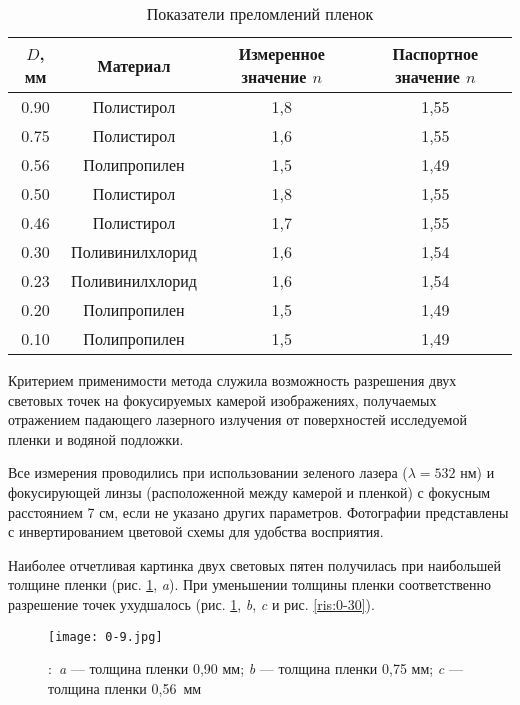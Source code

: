 \begin{table}[h]\small
\caption*{Показатели преломлений пленок}
\begin{center}
\begin{tabular}{|c|c|c|c|}
\hline
$D$, мм & Материал & Измеренное значение $n$ & Паспортное значение $n$ \\ \hline
0.90 & Полистирол & 1,8 & 1,55\\ \hline
0.75 & Полистирол & 1,6 & 1,55\\ \hline
0.56 & Полипропилен & 1,5 & 1,49\\ \hline
0.50 & Полистирол & 1,8 & 1,55\\ \hline
0.46 & Полистирол & 1,7 & 1,55\\ \hline
0.30 & Поливинилхлорид & 1,6 & 1,54\\ \hline
0.23 & Поливинилхлорид & 1,6 & 1,54\\ \hline
0.20 & Полипропилен & 1,5 & 1,49\\ \hline
0.10 & Полипропилен & 1,5 & 1,49\\ \hline
\end{tabular}
\end{center}
\label{tab:tab1-D}
\end{table}


Критерием применимости метода служила возможность разрешения двух световых точек на фокусируемых камерой изображениях, получаемых отражением падающего лазерного излучения от поверхностей исследуемой пленки и водяной подложки.


Все измерения проводились при использовании зеленого лазера
($\lambda=532$ нм) и фокусирующей линзы (расположенной между камерой и пленкой) с фокусным расстоянием 7 см, если не указано других параметров. Фотографии представлены с инвертированием цветовой схемы для удобства восприятия.


Наиболее отчетливая картинка двух световых пятен получилась при наибольшей толщине пленки (рис. \ref{ris:0-9}, \emph{a}). При уменьшении толщины пленки соответственно разрешение точек ухудшалось (рис. \ref{ris:0-9}, \emph{b}, \emph{c} и рис. \ref{ris:0-30}).

\begin{figure}[h]
\begin{center}
\texttt{[image: 0-9.jpg]}
\end{center}
\caption{\!\!\!\!:\ \emph{a} --- толщина пленки 0,90 мм; \emph{b} --- толщина пленки 0,75 мм; \emph{c} --- толщина пленки 0,56~мм}
\label{ris:0-9}
\end{figure}


